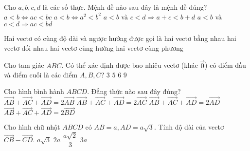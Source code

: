 \begin{ex}%
    Cho $a,b,c,d$ là các số thực. Mệnh đề nào sau đây là mệnh đề đúng?
    \choice
    {$a<b\Leftrightarrow ac<bc$}
    {$a<b\Leftrightarrow a^2<b^2$}
    {\True $a<b$ và $c<d\Rightarrow a+c<b+d$}
    {$a<b$ và $c<d\Rightarrow ac<bd$}
\end{ex}

\begin{ex}%
    Hai vectơ có cùng độ dài và ngược hướng được gọi là
    \choice
    {hai vectơ bằng nhau}
    {\True hai vectơ đối nhau}
    {hai vectơ cùng hướng}
    {hai vectơ cùng phương}
\end{ex}
\begin{ex}%
    Cho tam giác $ABC$. Có thể xác định được bao nhiêu vectơ (khác $\vec{0}$) có điểm đầu và điểm cuối là các điểm $A,B,C$?
    \choice
    {$3$}
    {$5$}
    {\True $6$}
    {$9$}
\end{ex}
\begin{ex}%
    Cho hình bình hành $ABCD$. Đẳng thức nào sau đây đúng?
    \choice
    {$\overrightarrow{AB}+\overrightarrow{AC}+\overrightarrow{AD}=2\overrightarrow{AB}$}
    {\True $\overrightarrow{AB}+\overrightarrow{AC}+\overrightarrow{AD}=2\overrightarrow{AC}$}
    {$\overrightarrow{AB}+\overrightarrow{AC}+\overrightarrow{AD}=2\overrightarrow{AD}$}
    {$\overrightarrow{AB}+\overrightarrow{AC}+\overrightarrow{AD}=2\overrightarrow{BD}$}
\end{ex}
\begin{ex}%
    Cho hình chữ nhật $ABCD$ có $AB=a, AD=a\sqrt{3}$. Tính độ dài của vectơ $\overrightarrow{CB}-\overrightarrow{CD}.$
    \choice
    {$a\sqrt{3}$}
    {\True $2a$}
    {$\dfrac{a\sqrt{2}}{3}$}
    {$3a$}
\end{ex}
